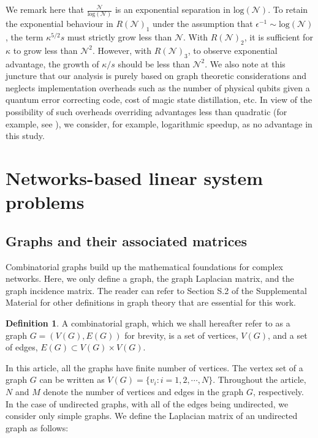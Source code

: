 \documentclass[%
 reprint,
 superscriptaddress,
 amsmath,amssymb,
 aps,
 pra,
floatfix,
nofootinbib,
]{revtex4-2}
\theoremstyle{definition}
\newtheorem{definition}{Definition}[section]
\theoremstyle{remark}
\begin{document}
We remark here that $\frac{\mathcal{N}}{\mathrm{log}(\mathcal{N})}$ is an exponential separation in $\mathrm{log}(\mathcal{N})$. To retain the exponential behaviour in $R(\mathcal{N})_{1}$ under the assumption that $\epsilon^{-1} \sim \mathrm{log}(\mathcal{N})$, the term $\kappa^{5/2}s$ must strictly grow less than $\mathcal{N}$. With $R(\mathcal{N})_{2}$, it is sufficient for $\kappa$ to grow less than $\mathcal{N}^2$. However, with $R(\mathcal{N})_3$, to observe exponential advantage, the growth of $\kappa/s$ should be less than $\mathcal{N}^2$. We also note at this juncture that our analysis is purely based on graph theoretic considerations and neglects implementation overheads such as the number of physical qubits given a quantum error correcting code, cost of magic state distillation, etc. In view of the possibility of such overheads overriding advantages less than quadratic (for example, see \cite{prx2021}), we consider, for example, logarithmic speedup, as no advantage in this study.

\section{Networks-based linear system problems} \label{sec:cn-lsp}

\subsection{Graphs and their associated matrices} \label{sec:graphtheory}

Combinatorial graphs build up the mathematical foundations for complex networks. Here, we only define a graph, the graph Laplacian matrix, and the graph incidence matrix. The reader can refer to Section S.2 of the Supplemental Material for other definitions in graph theory that are essential for this work. 

\begin{definition} \label{def:graph}
A combinatorial graph, which we shall hereafter refer to as a graph $G = (V(G), E(G))$ for brevity, is a set of vertices, $V(G)$, and a set of edges, $E(G) \subset V(G) \times V(G)$. 
\end{definition} 

In this article, all the graphs have finite number of vertices. The vertex set of a graph $G$ can be written as $V(G) = \{v_i: i = 1, 2, \cdots, N\}$. Throughout the article, $N$ and $M$ denote the number of vertices and edges in the graph $G$, respectively. In the case of undirected graphs, with all of the edges being undirected, we consider only simple graphs. We define the Laplacian matrix of an undirected graph as follows: 
\end{document}
